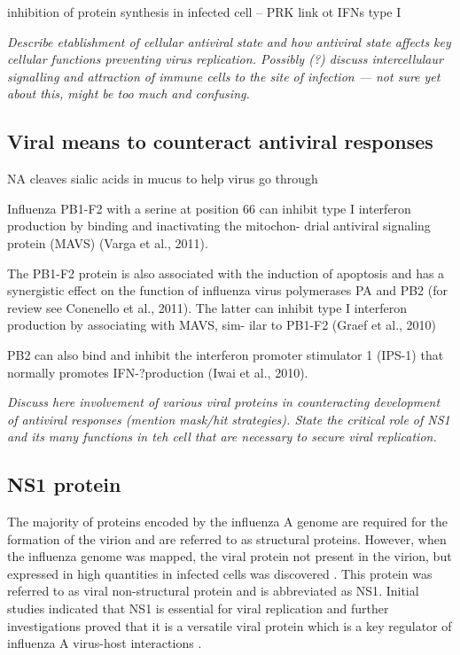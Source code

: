 	
		inhibition of protein synthesis in infected cell -- PRK link ot IFNs type I
		
		\textit{Describe etablishment of cellular antiviral state and how antiviral state affects key cellular functions preventing virus replication. Possibly (?) discuss intercellulaur signalling and attraction of immune cells to the site of infection --- not sure yet about this, might be too much and confusing.}
		
	\subsection{Viral means to counteract antiviral responses}
	
	NA cleaves sialic acids in mucus to help virus go through
	
	Influenza PB1-F2 with a serine at position 66 can inhibit type
	I interferon production by binding and inactivating the mitochon- drial antiviral signaling protein (MAVS) (Varga et al., 2011).
	
	The PB1-F2 protein is also associated with the induction of apoptosis and has a synergistic effect on the function of influenza virus polymerases PA and PB2 (for review see Conenello et al., 2011). The latter can inhibit type I interferon production by associating with MAVS, sim- ilar to PB1-F2 (Graef et al., 2010)
	
	PB2 can also bind and inhibit the interferon promoter stimulator 1 (IPS-1) that normally promotes IFN-?production (Iwai et al., 2010).
	
	
		\textit{Discuss here involvement of various viral proteins in counteracting development of antiviral responses (mention mask/hit strategies). State the critical role of NS1 and its many functions in teh cell that are necessary to secure viral replication.}
			
	\subsection{NS1 protein}
		
		The majority of proteins encoded by the influenza A genome are required for the formation of the virion and are referred to as structural proteins. However, when the influenza genome was mapped, the viral protein not present in the virion, but expressed in high quantities in infected cells was discovered \parencite{Ritchey1976}. This protein was referred to as viral non-structural protein and is abbreviated as \gls{NS1}. Initial studies indicated that \gls{NS1} is essential for viral replication \parencite{Koennecke1981} and further investigations proved that it is a versatile viral protein which is a key regulator of influenza A virus-host interactions \parencite{Ayllon2015}.
		
